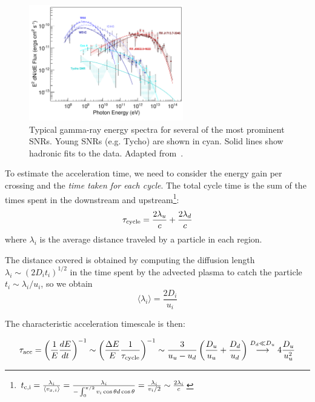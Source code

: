 \begin{figure}[t]
\centering
\includegraphics[width=0.6\textwidth]{figures/SNRspectra.pdf} 
\caption{Typical gamma-ray energy spectra for several of the most prominent SNRs. Young SNRs (e.g. Tycho) are shown in cyan. Solid lines show hadronic fits to the data. Adapted from~\cite{Funk2015}.}
\label{fig:snrspectra}
\end{figure}


To estimate the acceleration time, we need to consider the energy gain per crossing and the \emph{time taken for each cycle}.
%
The total cycle time is the sum of the times spent in the downstream and upstream\footnote{$
t_{\rm c, i} = \frac{\lambda_i}{\langle v_{x,i} \rangle} = \frac{\lambda_i}{-\int_0^{\pi/2} v_i \cos \theta d\cos\theta} = \frac{\lambda_i}{v_i / 2} \sim \frac{2\lambda_i}{c}$}:
%
\begin{equation}
\tau_{\rm cycle} = \frac{2\lambda_u}{c} + \frac{2\lambda_d}{c} %
\end{equation}
%
where \( \lambda_i \) is the average distance traveled by a particle in each region.

The distance covered is obtained by computing the diffusion length \( \lambda_i \sim (2 D_i t_i)^{1/2} \) in the time spent by the advected plasma to catch the particle \( t_i \sim \lambda_i / u_i \), so we obtain
%
\begin{equation}
\langle \lambda_i \rangle = \frac{2 D_i}{u_i}
\end{equation} 
%


The characteristic acceleration timescale is then:
%
\begin{remark}
\begin{equation}
\tau_{\text{acc}} = \left( \frac{1}{E} \frac{dE}{dt} \right)^{-1} \sim \left( \frac{\Delta E}{E} \frac{1}{\tau_{\rm cycle}} \right)^{-1} \sim \frac{3}{u_u - u_d} \left( \frac{D_u}{u_u} + \frac{D_d}{u_d} \right) \oset{D_d \ll D_u}{\longrightarrow} 4 \frac{D_u}{u_u^2}
\end{equation}
\end{remark}

